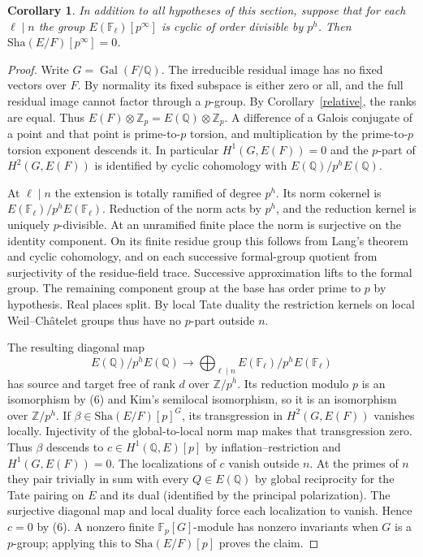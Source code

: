 \documentclass[11pt]{article}
\newtheorem{corollary}[theorem]{Corollary}
\newcommand{\Q}{\mathbb Q}
\newcommand{\Z}{\mathbb Z}
\newcommand{\F}{\mathbb F}
\newcommand{\Sha}{\mathrm{Sha}}
\begin{document}
\begin{corollary}
In addition to all hypotheses of this section, suppose that for each
$\ell\mid n$ the group
$E(\F_\ell)[p^\infty]$ is cyclic of order divisible by $p^h$.
Then $\Sha(E/F)[p^\infty]=0$.
\end{corollary}
\begin{proof}
Write $G=\operatorname{Gal}(F/\Q)$. The irreducible residual image
has no fixed vectors over $F$. By normality its fixed subspace
is either zero or all, and the full residual image cannot factor
through a $p$-group. By Corollary~\ref{relative}, the ranks are
equal. Thus $E(F)\otimes\Z_p=E(\Q)\otimes\Z_p$. A difference of a
Galois conjugate of a point and that point is prime-to-$p$ torsion,
and multiplication by the prime-to-$p$ torsion exponent descends it.
In particular $H^1(G,E(F))=0$ and the $p$-part of
$H^2(G,E(F))$ is identified by cyclic cohomology with
$E(\Q)/p^hE(\Q)$.

At $\ell\mid n$ the extension is totally ramified of degree $p^h$.
Its norm cokernel is $E(\F_\ell)/p^hE(\F_\ell)$. Reduction of the
norm acts by $p^h$, and the reduction kernel is uniquely
$p$-divisible. At an unramified finite place the norm is
surjective on the identity component. On its finite residue group
this follows from Lang's theorem and cyclic cohomology, and on each
successive formal-group quotient from surjectivity of the residue-field
trace. Successive approximation lifts to the formal group. The remaining
component group at the base has order prime to $p$ by hypothesis.
Real places split. By local Tate duality the restriction kernels on
local Weil--Ch\^atelet groups thus have no $p$-part outside $n$.

The resulting diagonal map
\[
 E(\Q)/p^hE(\Q)\longrightarrow
 \bigoplus_{\ell\mid n}E(\F_\ell)/p^hE(\F_\ell)
\]
has source and target free of rank $d$ over $\Z/p^h$. Its reduction modulo $p$
is an isomorphism by (6) and Kim's semilocal isomorphism, so it
is an isomorphism over $\Z/p^h$.
If $\beta\in\Sha(E/F)[p]^G$, its transgression in $H^2(G,E(F))$
vanishes locally. Injectivity of the global-to-local norm map
makes that transgression zero. Thus $\beta$ descends to
$c\in H^1(\Q,E)[p]$ by inflation--restriction and $H^1(G,E(F))=0$.
The localizations of $c$ vanish outside $n$. At the primes of $n$
they pair trivially in sum with every $Q\in E(\Q)$ by global
reciprocity for the Tate pairing on $E$ and its dual (identified by the principal
polarization). The surjective diagonal map and local
duality force each localization to vanish. Hence $c=0$ by (6).
A nonzero finite $\F_p[G]$-module has nonzero invariants when $G$
is a $p$-group; applying this to $\Sha(E/F)[p]$ proves the claim.
\end{proof}
\end{document}
